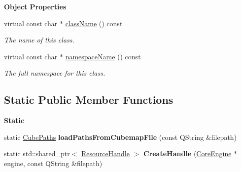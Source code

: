 \begin{Indent}\textbf{ Object Properties}\par
\begin{DoxyCompactItemize}
\item 
\mbox{\label{classrev_1_1_cube_texture_a7ec1956c0d81071b9f129ddb08725734}} 
virtual const char $\ast$ \mbox{\hyperlink{classrev_1_1_cube_texture_a7ec1956c0d81071b9f129ddb08725734}{class\+Name}} () const
\begin{DoxyCompactList}\small\item\em The name of this class. \end{DoxyCompactList}\item 
\mbox{\label{classrev_1_1_cube_texture_af6794b135f279b1b011d47f9a7f9d10b}} 
virtual const char $\ast$ \mbox{\hyperlink{classrev_1_1_cube_texture_af6794b135f279b1b011d47f9a7f9d10b}{namespace\+Name}} () const
\begin{DoxyCompactList}\small\item\em The full namespace for this class. \end{DoxyCompactList}\end{DoxyCompactItemize}
\end{Indent}
\subsection*{Static Public Member Functions}
\begin{Indent}\textbf{ Static}\par
\begin{DoxyCompactItemize}
\item 
\mbox{\label{classrev_1_1_cube_texture_aadb1550b28b64fe20d8c4ec54d61b678}} 
static \mbox{\hyperlink{structrev_1_1_cube_paths}{Cube\+Paths}} {\bfseries load\+Paths\+From\+Cubemap\+File} (const Q\+String \&filepath)
\item 
\mbox{\label{classrev_1_1_cube_texture_a64f22eecda79f6531adfadeb0392d369}} 
static std\+::shared\+\_\+ptr$<$ \mbox{\hyperlink{classrev_1_1_resource_handle}{Resource\+Handle}} $>$ {\bfseries Create\+Handle} (\mbox{\hyperlink{classrev_1_1_core_engine}{Core\+Engine}} $\ast$engine, const Q\+String \&filepath)
\end{DoxyCompactItemize}
\end{Indent}

